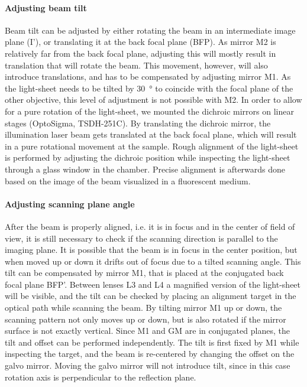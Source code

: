     \paragraph{Adjusting beam tilt}
      Beam tilt can be adjusted by either rotating the beam in an intermediate image plane (I'), or translating it at the back focal plane (BFP). As mirror M2 is relatively far from the back focal plane, adjusting this will mostly result in translation that will rotate the beam. This movement, however, will also introduce translations, and has to be compensated by adjusting mirror M1. As the light-sheet needs to be tilted by \SI{30}{\degree} to coincide with the focal plane of the other objective, this level of adjustment is not possible with M2. In order to allow for a pure rotation of the light-sheet, we mounted the dichroic mirrors on linear stages (OptoSigma, TSDH-251C). By translating the dichroic mirror, the illumination laser beam gets translated at the back focal plane, which will result in a pure rotational movement at the sample. Rough alignment of the light-sheet is performed by adjusting the dichroic position while inspecting the light-sheet through a glass window in the chamber. Precise alignment is afterwards done based on the image of the beam visualized in a fluorescent medium.




    \paragraph{Adjusting scanning plane angle}
      After the beam is properly aligned, i.e. it is in focus and in the center of field of view, it is still necessary to check if the scanning direction is parallel to the imaging plane. It is possible that the beam is in focus in the center position, but when moved up or down it drifts out of focus due to a tilted scanning angle. This tilt can be compensated by mirror M1, that is placed at the conjugated back focal plane BFP'. Between lenses L3 and L4 a magnified version of the light-sheet will be visible, and the tilt can be checked by placing an alignment target in the optical path while scanning the beam. By tilting mirror M1 up or down, the scanning pattern not only moves up or down, but is also rotated if the mirror surface is not exactly vertical. Since M1 and GM are in conjugated planes, the tilt and offset can be performed independently. The tilt is first fixed by M1 while inspecting the target, and the beam is re-centered by changing the offset on the galvo mirror. Moving the galvo mirror will not introduce tilt, since in this case rotation axis is perpendicular to the reflection plane.




